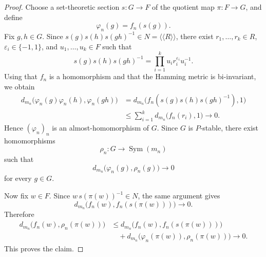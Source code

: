 \documentclass[10pt,a4paper]{amsart}
\DeclareMathOperator{\Sym}{Sym}
\begin{document}
\begin{proof}
Choose a set-theoretic section
$s\colon G\to F$
of the quotient map $\pi\colon F\to G$, and define
$$\varphi_n(g)=f_n(s(g)).$$
Fix $g,h\in G$. Since
$s(g)s(h)s(gh)^{-1}\in N=\langle\!\langle R\rangle\!\rangle$,
there exist $r_1,\ldots,r_k\in R$, $\varepsilon_i\in\{-1,1\}$, and
$u_1,\ldots,u_k\in F$ such that
$$s(g)s(h)s(gh)^{-1}=
\prod_{i=1}^k u_i r_i^{\varepsilon_i}u_i^{-1}.$$
Using that $f_n$ is a homomorphism and that the Hamming metric is
bi-invariant, we obtain
$$
\begin{aligned}
d_{m_n}\bigl(\varphi_n(g)\varphi_n(h),\varphi_n(gh)\bigr)
&=
d_{m_n}\bigl(f_n(s(g)s(h)s(gh)^{-1}),1\bigr)\\
&\leq
\sum_{i=1}^k d_{m_n}\bigl(f_n(r_i),1\bigr)
\longrightarrow0.
\end{aligned}
$$
Hence $(\varphi_n)_n$ is an almost-homomorphism of $G$.
Since $G$ is $P$-stable, there exist homomorphisms
$$\rho_n\colon G\to\Sym(m_n)$$
such that
$$d_{m_n}\bigl(\varphi_n(g),\rho_n(g)\bigr)\longrightarrow0$$
for every $g\in G$.

Now fix $w\in F$. Since
$w\,s(\pi(w))^{-1}\in N$,
the same argument gives
$$d_{m_n}\bigl(f_n(w),f_n(s(\pi(w)))\bigr)\longrightarrow0.$$
Therefore
$$
\begin{aligned}
d_{m_n}\bigl(f_n(w),\rho_n(\pi(w))\bigr)
&\leq
d_{m_n}\bigl(f_n(w),f_n(s(\pi(w)))\bigr)\\
&\quad+
d_{m_n}\bigl(\varphi_n(\pi(w)),\rho_n(\pi(w))\bigr)
\longrightarrow0.
\end{aligned}
$$
This proves the claim.
\end{proof}
\end{document}
